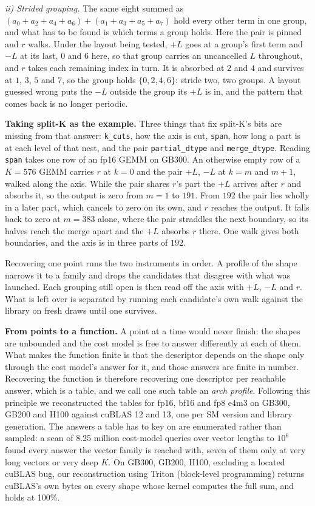 \documentclass[sigplan,nonacm]{acmart}
\begin{document}
\textit{ii) Strided grouping.} The same eight summed as
$(a_0 + a_2 + a_4 + a_6) + (a_1 + a_3 + a_5 + a_7)$ hold every other term in one
group, and what has to be found is which terms a group holds. Here the pair is
pinned and $r$ walks. Under the layout being tested, $+L$ goes at a group's
first term and $-L$ at its last, $0$ and $6$ here, so that group carries an
uncancelled $L$ throughout, and $r$ takes each remaining index in turn. It is
absorbed at $2$ and $4$ and survives at $1$, $3$, $5$ and $7$, so the group
holds $\{0, 2, 4, 6\}$: stride two, two groups. A layout guessed wrong puts the
$-L$ outside the group its $+L$ is in, and the pattern that comes back is no
longer periodic.





\textbf{Taking split-K as the example.} Three things that fix split-K's bits
are missing from that answer: \texttt{k\_cuts}, how the axis is cut,
\texttt{span}, how long a part is at each level of that nest, and the pair
\texttt{partial\_dtype} and \texttt{merge\_dtype}. Reading \texttt{span} takes one
row of an fp16 GEMM on GB300. An otherwise empty row of a $K = 576$ GEMM carries
$r$ at $k = 0$ and the pair $+L$, $-L$ at $k = m$ and $m + 1$, walked along the
axis. While the pair shares $r$'s part the $+L$ arrives after $r$ and absorbs
it, so the output is zero from $m = 1$ to $191$. From $192$ the pair lies wholly
in a later part, which cancels to zero on its own, and $r$ reaches the output.
It falls back to zero at $m = 383$ alone, where the pair straddles the next
boundary, so its halves reach the merge apart and the $+L$ absorbs $r$ there.
One walk gives both boundaries, and the axis is in three parts of $192$.

Recovering one point runs the two instruments in order. A profile of the shape
narrows it to a family and drops the candidates that disagree with what was
launched. Each grouping still open is then read off the axis with $+L$, $-L$ and
$r$. What is left over is separated by running each candidate's own walk against
the library on fresh draws until one survives.

\textbf{From points to a function.} A point at a time would never finish:
the shapes are unbounded and the cost model is free to answer differently at each
of them. What makes the function finite is that the descriptor depends on the
shape only through the cost model's answer for it, and those answers are finite
in number. Recovering the function is therefore
recovering one descriptor per reachable answer, which is a table, and we call
one such table an \emph{arch profile}. Following this principle we reconstructed
the tables for fp16, bf16 and fp8 e4m3 on GB300, GB200 and H100 
against cuBLAS 12 and 13, one per SM
version and library generation. The
answers a table has to key on are
enumerated rather than sampled: a scan of 8.25 million cost-model queries over
vector lengths to $10^6$ found every answer the vector family is reached with,
seven of them only at very long vectors or very deep $K$. 
On GB300, GB200, H100, excluding a located cuBLAS bug,
our reconstruction using Triton (block-level programming)
returns cuBLAS's own bytes on every shape whose kernel computes the full sum,
and holds at 100\%.  
\end{document}
